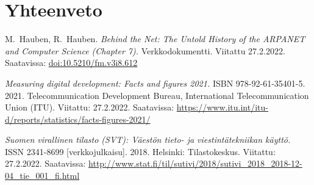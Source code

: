 \documentclass[finnish, 12pt, a4paper, elec, utf8, a-1b, online]{aaltothesis}
\begin{document}
\clearpage


\section{Yhteenveto}


\clearpage


\thesisbibliography
\begin{thebibliography}{99}

    M.\ Hauben, R.\ Hauben.
    \textit{Behind the Net: The Untold History of the ARPANET and Computer Science (Chapter 7).}
    Verkkodokumentti.
    Viitattu 27.2.2022.
    Saatavissa: \url{doi:10.5210/fm.v3i8.612}

    \textit{Measuring digital development: Facts and figures 2021.}
    ISBN 978-92-61-35401-5.
    2021.
    Telecommunication Development Bureau, International Telecommunication Union (ITU).
    Viitattu: 27.2.2022.
    Saatavissa: \url{https://www.itu.int/itu-d/reports/statistics/facts-figures-2021/}

    \textit{Suomen virallinen tilasto (SVT): Väestön tieto- ja viestintätekniikan käyttö.}
    ISSN 2341-8699 [verkkojulkaisu].
    2018.
    Helsinki: Tilastokeskus.
    Viitattu: 27.2.2022.
    Saatavissa: \url{http://www.stat.fi/til/sutivi/2018/sutivi_2018_2018-12-04_tie_001_fi.html}

\end{thebibliography}


\end{document}
